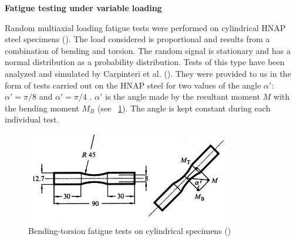 \documentclass[3p,times,procedia,number]{elsarticle}
\newcommand{\figref}[1]{\figurename~\ref{#1}}
\begin{document}
\noindent
\vspace{6pt}
\textbf{Fatigue testing under variable loading}
\vspace{6pt}

Random multiaxial loading fatigue tests were performed on cylindrical HNAP steel specimens (\cite{ACHTELIC1994}). The load considered is proportional and results from a combination of bending and torsion. The random signal is stationary and has a normal distribution as a probability distribution. Tests of this type have been analyzed and simulated by Carpinteri et al. (\cite{carpinteri2003multiaxial}). They were provided to us in the form of tests carried out on the HNAP steel for two values of the angle $\alpha'$: $\alpha' = \pi / 8$ and $\alpha' = \pi / 4$ . $\alpha' $ is the angle made by the resultant moment $M$ with the bending moment $M_B$ (see \figref{fig.10HNAPsample}). The angle is kept constant during each individual test. 

\begin{figure}[!h]
	\centering
	\includegraphics[width=0.8\textwidth]{figures//10HNAPsample.png} 
	\caption{Bending-torsion fatigue tests on cylindrical specimens (\cite{carpinteri2003multiaxial})}
	\label{fig.10HNAPsample}
\end{figure}
\end{document}
